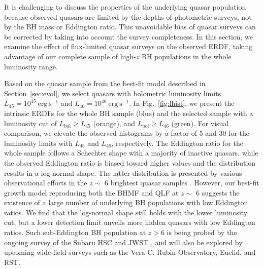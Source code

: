 \documentclass[twocolumn, twocolappendix]{aastex63}
\newcommand{\Lbol}{L_\mathrm{bol}}
\begin{document}
\begin{CJK*}{UTF8}{gbsn}
It is challenging to discuss the properties of the underlying quasar population
because observed quasars are limited by the depths of photometric surveys, not by the BH mass or Eddington ratio.
This unavoidable bias of quasar surveys can be corrected by taking into account the survey completeness.
In this section, we examine the effect of flux-limited quasar surveys on the observed ERDF, 
taking advantage of our complete sample of high-$z$ BH populations in the whole luminosity range. 


Based on the quasar sample from the best-fit model described in Section~\ref{sec:evol}, 
we select quasars with bolometric luminosity limits $L_{45}=10^{45}~\mathrm{erg~s^{-1}}$ and $L_{46}=10^{46}~\mathrm{erg~s^{-1}}$.
In Fig.~\ref{fig:lhist}, we present the intrinsic ERDFs for the whole BH sample (blue)
and the selected sample with a luminosity cut of $\Lbol \geq L_{45}$ (orange),
and $\Lbol \geq L_{46}$ (green).
For visual comparison, we elevate the observed histograms by a factor of 5 and 30
for the luminosity limits with $L_{45}$ and $L_{46}$, respectively.
The Eddington ratio for the whole sample follows a Schechter shape with a majority of inactive quasars, 
while the observed Eddington ratio is biased toward higher values and the distribution results in a log-normal shape. 
The latter distribution is presented by various observational efforts in the $z\sim$ 6 brightest quasar samples 
\citep[e.g.,][]{2010AJ....140..546W,2019ApJ...873...35S,2021ApJ...923..262Y,2022arXiv220705113F}.
However, our best-fit growth model reproducing both the BHMF and QLF at $z\sim$ 6 suggests the existence of
a large number of underlying BH populations with low Eddington ratios. 
We find that the log-normal shape still holds with the lower luminosity cut, 
but a lower detection limit unveils more hidden quasars with low Eddington ratios. 
Such sub-Eddington BH population at $z>6$ is being probed by the ongoing survey of the Subaru HSC and JWST
\citep{2019ApJ...880...77O,2021jwst.prop.1967O},
and will also be explored by upcoming wide-field surveys such as the Vera C. Rubin Observatory, Euclid, and RST.




\end{CJK*}
\end{document}
